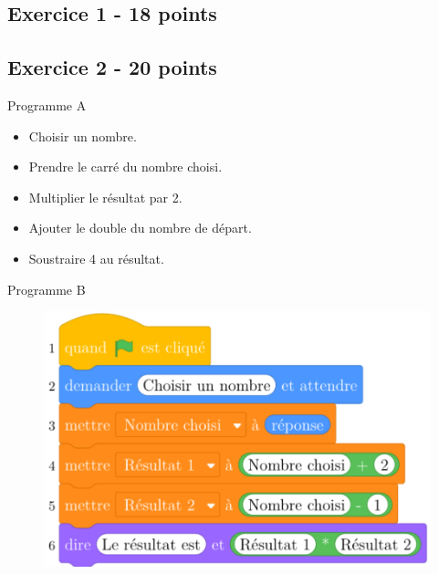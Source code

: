 \newpage

\subsection*{Exercice 1 - 18 points }


\subsection*{Exercice 2 - 20 points }

\begin{multicols}{2}\noindent
Programme A

\begin{itemize}[label={$\bullet$}]
  \item Choisir un nombre.
  \item Prendre le carré du nombre choisi.
  \item Multiplier le résultat par 2.
  \item Ajouter le double du nombre de départ. 
  \item Soustraire 4 au résultat.
\end{itemize} \columnbreak


Programme B

\begin{figure}[H]
  \centering
  \includegraphics[width=0.8\linewidth]{bb2-ex2.png}
\end{figure}

\end{multicols}




